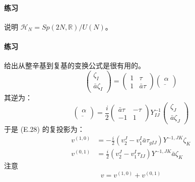 \paragraph{练习}
说明 $\mathcal{H}_N=Sp(2N,\mathbb{R})/U(N)$。

\paragraph{练习}
给出从整辛基到复基的变换公式是很有用的。
\begin{equation}
  \begin{pmatrix}\zeta_I\\ \bar a\zeta_I\end{pmatrix}
  = \begin{pmatrix} 1 & \tau\\ 1 & \bar a\tau\end{pmatrix}
  \begin{pmatrix}\alpha\\ \bar{\ }\end{pmatrix}
  \tag{E.32}
  \label{eq:E.32}
\end{equation}
其逆为：
\begin{equation}
  \begin{pmatrix}\alpha\\ \bar{\ }\end{pmatrix}
  = \frac{i}{2}\begin{pmatrix} \bar a\tau & -\tau\\ -1 & 1\end{pmatrix}
  Y^{-1}_{IJ}
  \begin{pmatrix}\zeta_J\\ \bar a\zeta_J\end{pmatrix}
  \tag{E.33}
  \label{eq:E.33}
\end{equation}
于是 (E.28) 的复投影为：
\begin{equation}
\begin{aligned}
  v^{(1,0)} &= -\frac{i}{2}\left(v_2^J-v_1^I\bar a\tau_{gIJ}\right)Y^{-1,JK}\zeta_K\\
  v^{(0,1)} &= \frac{i}{2}\left(v_2^J-v_1^I\tau_{IJ}\right)Y^{-1,JK}\bar a\zeta_K
\end{aligned}
\tag{E.34}
\label{eq:E.34}
\end{equation}
注意
\begin{equation}
  v = v^{(1,0)}+v^{(0,1)}
  \tag{E.35}
  \label{eq:E.35}
\end{equation}


